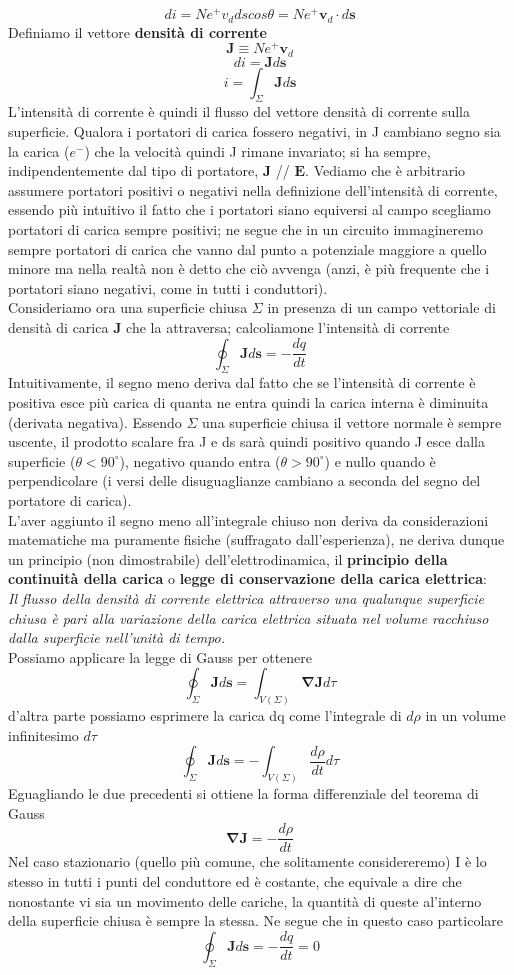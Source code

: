 \documentclass[10pt,a4paper]{article}
\begin{document}
\[di = N e^+ v_d ds cos\theta = N e^+ \mathbf{v}_d\cdot d\mathbf{s}\]
Definiamo il vettore \textbf{densità di corrente}
\[\mathbf{J} \equiv N e^+ \mathbf{v}_d\]
\[di = \mathbf{J}d\mathbf{s}\]
\[i = \int_{\Sigma} \mathbf{J}d\mathbf{s}\]
L'intensità di corrente è quindi il flusso del vettore densità di corrente sulla superficie. Qualora i portatori di carica fossero negativi, in J cambiano segno sia la carica (\(e^-\)) che la velocità quindi J rimane invariato; si ha sempre, indipendentemente dal tipo di portatore, \(\mathbf{J}\) // $\mathbf{E}$. Vediamo che è arbitrario assumere portatori positivi o negativi nella definizione dell'intensità di corrente, essendo più intuitivo il fatto che i portatori siano equiversi al campo scegliamo portatori di carica sempre positivi; ne segue che in un circuito immagineremo sempre portatori di carica che vanno dal punto a potenziale maggiore a quello minore ma nella realtà non è detto che ciò avvenga (anzi, è più frequente che i portatori siano negativi, come in tutti i conduttori). \\
Consideriamo ora una superficie chiusa $\Sigma$ in presenza di un campo vettoriale di densità di carica $\mathbf{J}$ che la attraversa; calcoliamone l'intensità di corrente
\[\oint_\Sigma \mathbf{J}d\mathbf{s} = -\frac{dq}{dt}\]
Intuitivamente, il segno meno deriva dal fatto che se l'intensità di corrente è positiva esce più carica di quanta ne entra quindi la carica interna è diminuita (derivata negativa). Essendo $\Sigma$ una superficie chiusa il vettore normale è sempre uscente, il prodotto scalare fra J e ds sarà quindi positivo quando J esce dalla superficie ($\theta<90^\circ$), negativo quando entra ($\theta>90^\circ$) e nullo quando è perpendicolare (i versi delle disuguaglianze cambiano a seconda del segno del portatore di carica).\\
L'aver aggiunto il segno meno all'integrale chiuso non deriva da considerazioni matematiche ma puramente fisiche (suffragato dall'esperienza), ne deriva dunque un principio (non dimostrabile) dell'elettrodinamica, il \textbf{principio della continuità della carica} o \textbf{legge di conservazione della carica elettrica}:\\
\textit{Il flusso della densità di corrente elettrica attraverso una qualunque superficie chiusa è pari alla variazione della carica elettrica situata nel volume racchiuso dalla superficie nell'unità di tempo.}\\
Possiamo applicare la legge di Gauss per ottenere
\[\oint_\Sigma \mathbf{J}d\mathbf{s} = \int_{V(\Sigma)} \mathbf{\nabla}\mathbf{J} d\tau\]
d'altra parte possiamo esprimere la carica dq come l'integrale di \(d\rho\) in un volume infinitesimo \(d\tau\) 
\[\oint_\Sigma \mathbf{J}d\mathbf{s} = -\int_{V(\Sigma)}\frac{d\rho}{dt}d\tau\]
Eguagliando le due precedenti si ottiene la forma differenziale del teorema di Gauss
\[\mathbf{\nabla}\mathbf{J} = -\frac{d\rho}{dt}\]
Nel caso stazionario (quello più comune, che solitamente considereremo) I è lo stesso in tutti i punti del conduttore ed è costante, che equivale a dire che nonostante vi sia un movimento delle cariche, la quantità di queste al'interno della superficie chiusa è sempre la stessa. Ne segue che in questo caso particolare 
\[\oint_\Sigma \mathbf{J}d\mathbf{s} = -\frac{dq}{dt} = 0\]
\end{document}
